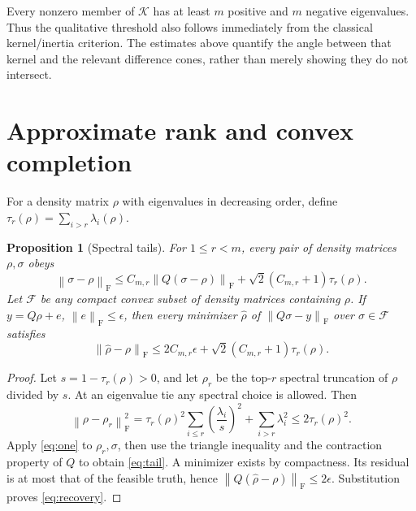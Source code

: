 \documentclass[11pt,a4paper]{article}
\newtheorem{proposition}[theorem]{Proposition}
\newcommand{\F}{\mathrm F}
\newcommand{\cK}{\mathcal K}
\newcommand{\norm}[1]{\left\lVert#1\right\rVert_{\F}}
\begin{document}
Every nonzero member of $\cK$ has at least $m$ positive and $m$
negative eigenvalues. Thus the qualitative threshold also follows
immediately from the classical kernel/inertia criterion. The estimates
above quantify the angle between that kernel and the relevant
difference cones, rather than merely showing they do not intersect.

\section{Approximate rank and convex completion}
For a density matrix $\rho$ with eigenvalues in decreasing order, define
$\tau_r(\rho)=\sum_{i>r}\lambda_i(\rho)$.

\begin{proposition}[Spectral tails]\label{prop:tail}
For $1\le r<m$, every pair of density matrices $\rho,\sigma$ obeys
\begin{equation}\label{eq:tail}
 \norm{\sigma-\rho}
 \le C_{m,r}\norm{Q(\sigma-\rho)}
       +\sqrt2(C_{m,r}+1)\tau_r(\rho).
\end{equation}
Let $\mathcal F$ be any compact convex subset of density matrices
containing $\rho$. If $y=Q\rho+e$, $\norm e\le\epsilon$, then every
minimizer $\widehat\rho$ of $\norm{Q\sigma-y}$ over $\sigma\in\mathcal F$
satisfies
\begin{equation}\label{eq:recovery}
 \norm{\widehat\rho-\rho}
 \le2C_{m,r}\epsilon+\sqrt2(C_{m,r}+1)\tau_r(\rho).
\end{equation}
\end{proposition}
\begin{proof}
Let $s=1-\tau_r(\rho)>0$, and let $\rho_r$ be the top-$r$ spectral
truncation of $\rho$ divided by $s$. At an eigenvalue tie any spectral
choice is allowed. Then
\[
 \norm{\rho-\rho_r}^2
 =\tau_r(\rho)^2\sum_{i\le r}\left(\frac{\lambda_i}{s}\right)^2
   +\sum_{i>r}\lambda_i^2
 \le2\tau_r(\rho)^2.
\]
Apply \eqref{eq:one} to $\rho_r,\sigma$, then use the triangle
inequality and the contraction property of $Q$ to obtain
\eqref{eq:tail}. A minimizer exists by compactness. Its residual is
at most that of the feasible truth, hence
$\norm{Q(\widehat\rho-\rho)}\le2\epsilon$.
Substitution proves \eqref{eq:recovery}.
\end{proof}
\end{document}
